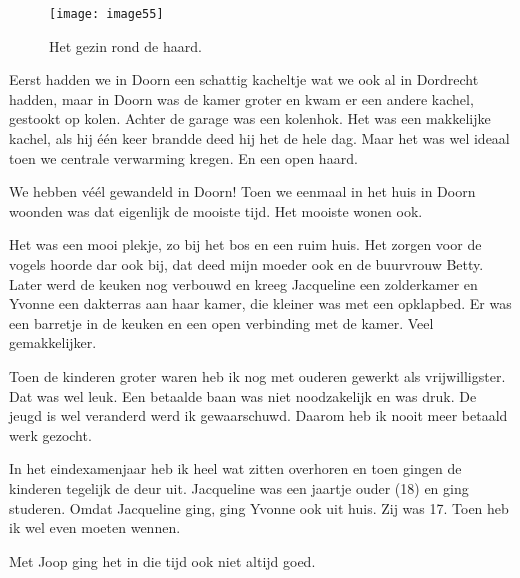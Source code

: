 \begin{figure}[h]
    \texttt{[image: image55]}
    \caption{Het gezin rond de haard.}
\end{figure}

Eerst hadden we in Doorn een schattig kacheltje wat we ook al in Dordrecht hadden, maar in Doorn was de kamer groter en kwam er een andere kachel, gestookt op kolen. Achter de garage was een kolenhok. Het was een makkelijke kachel, als hij \'{e}\'{e}n keer brandde deed hij het de hele dag. Maar het was wel ideaal toen we centrale verwarming kregen. En een open haard.

We hebben v\'{e}\'{e}l gewandeld in Doorn! Toen we eenmaal in het huis in Doorn woonden was dat eigenlijk de mooiste tijd. Het mooiste wonen ook. 

Het was een mooi plekje, zo bij het bos en een ruim huis. Het zorgen voor de vogels hoorde dar ook bij, dat deed mijn moeder ook en de buurvrouw Betty. Later werd de keuken nog verbouwd en kreeg Jacqueline een zolderkamer en Yvonne een dakterras aan haar kamer, die kleiner was met een opklapbed. Er was een barretje in de keuken en een open verbinding met de kamer. Veel gemakkelijker.

Toen de kinderen groter waren heb ik nog met ouderen gewerkt als vrijwilligster. Dat was wel leuk. Een betaalde baan was niet noodzakelijk en was druk. De jeugd is wel veranderd werd ik gewaarschuwd. Daarom heb ik nooit meer betaald werk gezocht.

In het eindexamenjaar heb ik heel wat zitten overhoren en toen gingen de kinderen tegelijk de deur uit. Jacqueline was een jaartje ouder (18) en ging studeren. Omdat Jacqueline ging, ging Yvonne ook uit huis. Zij was 17. Toen heb ik wel even moeten wennen. 

Met Joop ging het in die tijd ook niet altijd goed.